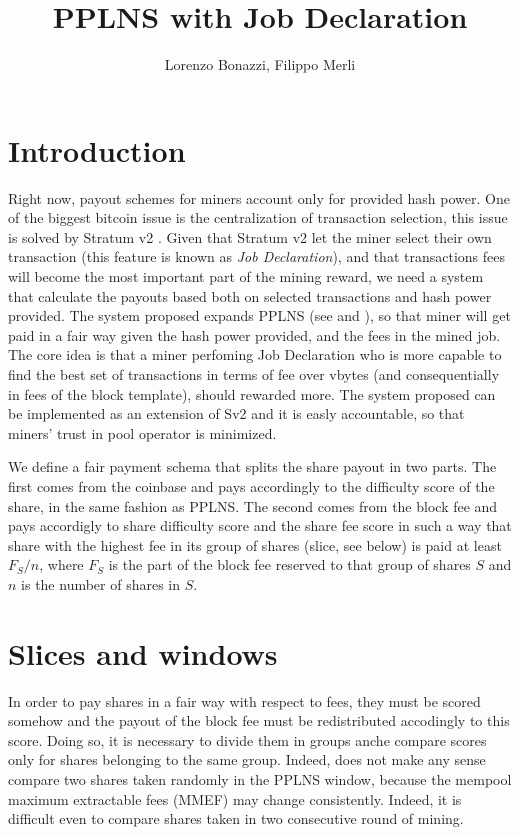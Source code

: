 \documentclass[11pt]{article} %
\title{PPLNS with Job Declaration}
\author{Lorenzo Bonazzi, Filippo Merli}
\begin{document}
\maketitle

\section{Introduction}

Right now, payout schemes for miners account only for provided hash power.
One of the biggest bitcoin issue is the centralization of transaction selection, this issue is solved by Stratum v2 \cite{sv2spec}. Given that Stratum v2 let the miner select their own transaction (this feature is known as \emph{Job Declaration}), and that transactions fees will become the most important part of the mining reward, we need a system that calculate the payouts based both on selected transactions and hash power provided. The system proposed expands PPLNS (see \cite{rosenfeld} and \cite{ocean}), so that miner will get paid in a fair way given the hash power provided, and the fees in the mined job. The core idea is that a miner perfoming Job Declaration who is more capable to find the best set of transactions in terms of fee over vbytes (and consequentially in fees of the block template), should rewarded more. The system proposed can be implemented as an extension of Sv2 \cite{extension} and it is easly accountable, so that miners' trust in pool operator is minimized. 

We define a fair payment schema that splits the share payout in two parts. The first comes from the coinbase and pays accordingly to the difficulty score of the share, in the same fashion as PPLNS. The second comes from the block fee and pays accordigly to share difficulty score and the share fee score in such a way that share with the highest fee in its group of shares (slice, see below) is paid at least $F_S/n$, where $F_S$ is the part of the block fee reserved to that group of shares $S$ and $n$ is the number of shares in $S$.

\section{Slices and windows}
In order to pay shares in a fair way with respect to fees, they must be scored somehow and the payout of the block fee must be redistributed accodingly to this score. Doing so, it is necessary to divide them in groups anche compare scores only for shares belonging to the same group. Indeed, does not make any sense compare two shares taken randomly in the PPLNS window, because the mempool maximum extractable fees (MMEF) may change consistently. Indeed, it is difficult even to compare shares taken in two consecutive round of mining.
\end{document}
